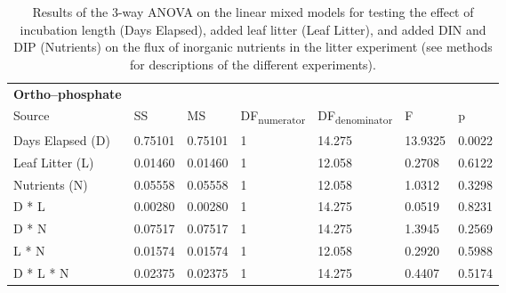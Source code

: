 \begin{table}
\begin{tabular}{ l l l l l l l }
\textbf{Ortho--phosphate} & & & & & &\\
Source           & SS      & MS      & DF\textsubscript{numerator} & DF\textsubscript{denominator} & F       & p  \\
Days Elapsed (D) & 0.75101 & 0.75101 & 1                           & 14.275                        & 13.9325 & 0.0022 \\
Leaf Litter (L)  & 0.01460 & 0.01460 & 1                           & 12.058                        & 0.2708  & 0.6122 \\
Nutrients (N)    & 0.05558 & 0.05558 & 1                           & 12.058                        & 1.0312  & 0.3298 \\
D * L            & 0.00280 & 0.00280 & 1                           & 14.275                        & 0.0519  & 0.8231 \\
D * N            & 0.07517 & 0.07517 & 1                           & 14.275                        & 1.3945  & 0.2569 \\
L * N            & 0.01574 & 0.01574 & 1                           & 12.058                        & 0.2920  & 0.5988 \\
D * L * N        & 0.02375 & 0.02375 & 1                           & 14.275                        & 0.4407  & 0.5174 \\

\end{tabular}
\caption{\label{tab:nut_anova}
Results of the 3-way ANOVA on the linear mixed models for testing the effect of incubation length (Days Elapsed), added leaf litter (Leaf Litter), and added DIN and DIP (Nutrients) on the flux of inorganic nutrients in the litter experiment (see methods for descriptions of the different experiments).}
\end{table}